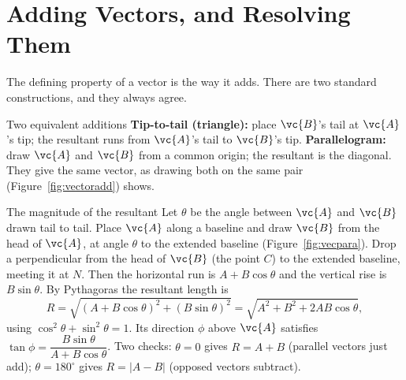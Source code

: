 \section{Adding Vectors, and Resolving Them}\label{sec:vecadd}

The defining property of a vector is the way it adds. There are two standard constructions, and they always
agree.

\begin{keybox}{Two equivalent additions}
\textbf{Tip-to-tail (triangle):} place $\vc{B}$'s tail at $\vc{A}$'s tip; the resultant runs from $\vc{A}$'s tail to
$\vc{B}$'s tip. \textbf{Parallelogram:} draw $\vc{A}$ and $\vc{B}$ from a common origin; the resultant is the
diagonal. They give the same vector, as drawing both on the same pair (Figure~\ref{fig:vectoradd}) shows.
\end{keybox}

\begin{figure}[htbp]
\centering
{}
\end{figure}

\begin{figure}[htbp]
\centering
{}
\end{figure}

\begin{derivbox}{The magnitude of the resultant}
Let $\theta$ be the angle between $\vc{A}$ and $\vc{B}$ drawn tail to tail. Place $\vc{A}$ along a
baseline and draw $\vc{B}$ from the head of $\vc{A}$, at angle $\theta$ to the extended baseline
(Figure~\ref{fig:vecpara}). Drop a perpendicular from the head of $\vc{B}$
(the point $C$) to the extended baseline, meeting it at $N$. Then the horizontal run is $A+B\cos\theta$ and the vertical
rise is $B\sin\theta$. By Pythagoras the resultant length is
\[
R=\sqrt{(A+B\cos\theta)^2+(B\sin\theta)^2}=\sqrt{A^2+B^2+2AB\cos\theta},
\]
using $\cos^2\theta+\sin^2\theta=1$. Its direction $\phi$ above $\vc{A}$ satisfies
$\tan\phi=\dfrac{B\sin\theta}{A+B\cos\theta}$. Two checks: $\theta=0$ gives $R=A+B$ (parallel vectors
just add); $\theta=180^\circ$ gives $R=|A-B|$ (opposed vectors subtract).
\end{derivbox}

